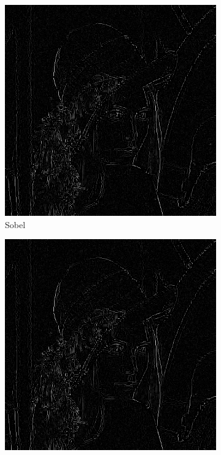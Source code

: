 \documentclass[a4paper]{article}
\begin{document}
\begin{figure}[H]
\centering
	\begin{subfigure}[t]{0.3\textwidth}
	\centering
	\includegraphics[width=\textwidth]{imagenesInforme/lenaNonMaximumSupressionGaussianSobel}
	\caption{Sobel}
	\end{subfigure}
	\begin{subfigure}[t]{0.3\textwidth}
	\centering
	\includegraphics[width=\textwidth]{imagenesInforme/lenaNonMaximumSupressionGaussianPrewitt}

\end{subfigure}
\end{figure}
\end{document}
